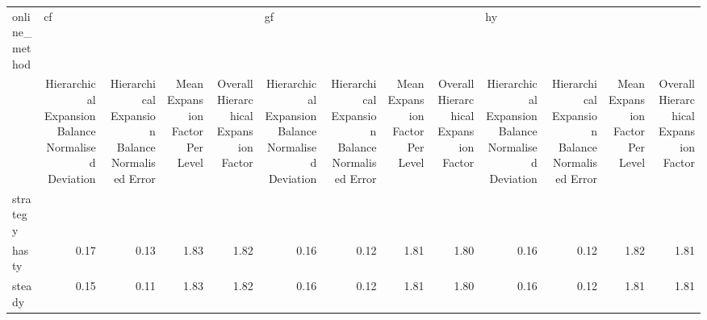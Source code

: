 \begin{tabular}{lrrrrrrrrrrrr}
\toprule
online\_method & \multicolumn{4}{l}{cf} & \multicolumn{4}{l}{gf} & \multicolumn{4}{l}{hy} \\
{} & Hierarchical Expansion Balance Normalised Deviation & Hierarchical Expansion Balance Normalised Error & Mean Expansion Factor Per Level & Overall Hierarchical Expansion Factor & Hierarchical Expansion Balance Normalised Deviation & Hierarchical Expansion Balance Normalised Error & Mean Expansion Factor Per Level & Overall Hierarchical Expansion Factor & Hierarchical Expansion Balance Normalised Deviation & Hierarchical Expansion Balance Normalised Error & Mean Expansion Factor Per Level & Overall Hierarchical Expansion Factor \\
strategy &                                                     &                                                 &                                 &                                       &                                                     &                                                 &                                 &                                       &                                                     &                                                 &                                 &                                       \\
\midrule
hasty    &                                               0.17 &                                            0.13 &                            1.83 &                                  1.82 &                                               0.16 &                                            0.12 &                            1.81 &                                  1.80 &                                               0.16 &                                            0.12 &                            1.82 &                                  1.81 \\
steady   &                                               0.15 &                                            0.11 &                            1.83 &                                  1.82 &                                               0.16 &                                            0.12 &                            1.81 &                                  1.80 &                                               0.16 &                                            0.12 &                            1.81 &                                  1.81 \\
\bottomrule
\end{tabular}
